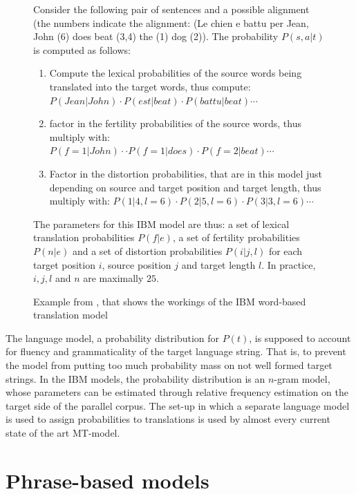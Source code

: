\documentclass{report}
\theoremstyle{break}
\begin{document}
\begin{figure}[!ht]
\begin{framed}
\scriptsize{
Consider the following pair of sentences and a possible alignment (the numbers indicate the alignment: (Le chien e battu per Jean, John (6) does beat (3,4) the (1) dog (2)). The probability $P(s,a|t)$ is computed as follows:\begin{enumerate}
\item Compute the lexical probabilities of the source words being translated into the target words, thus compute: $P(Jean|John)\cdot P(est|beat)\cdot P(battu|beat)\cdots$
\item factor in the fertility probabilities of the source words, thus multiply with:  $P(f\!=\!1|John)\cdot \cdot P(f\!=\!1|does) \cdot P(f\!=\!2|beat)\cdots $
\item Factor in the distortion probabilities, that are in this model just depending on source and target position and target length, thus multiply with: $P(1|4,l\!=\!6)\cdot P(2|5,l\!=\!6)\cdot P(3|3,l\!=\!6) \cdots $
\end{enumerate}
The parameters for this IBM model are thus: a set of lexical translation probabilities $P(f|e)$, a set of fertility probabilities $P(n|e)$ and a set of distortion probabilities $P(i|j,l)$ for each target position $i$, source position $j$ and target length $l$. In practice, $i,j,l$ and $n$ are maximally $25$.
}
\end{framed}
\caption{Example from \cite[p.3]{brown1990statistical}, that shows the workings of the IBM word-based translation model}\label{fig:IBM-model}
\end{figure}

The language model, a probability distribution for $P(t)$, is supposed to account for fluency and grammaticality of the target language string. That is, to prevent the model from putting too much probability mass on not well formed target strings. In the IBM models, the probability distribution is an $n$-gram model, whose parameters can be estimated through relative frequency estimation on the target side of the parallel corpus. The set-up in which a separate language model is used to assign probabilities to translations is used by almost every current state of the art MT-model.


\section{Phrase-based models}
\label{sec:pbmodels}
\end{document}
